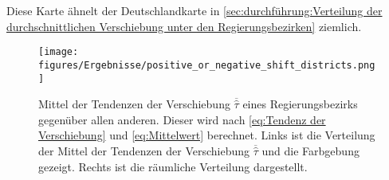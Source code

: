 Diese Karte ähnelt der Deutschlandkarte in \autoref{sec:durchführung:Verteilung der durchschnittlichen Verschiebung unter den Regierungsbezirken} ziemlich.

\begin{figure}[H]
    \centering
    \texttt{[image: figures/Ergebnisse/positive\_or\_negative\_shift\_districts.png]}
    \caption{
    Mittel der Tendenzen der Verschiebung $\overline{\hat{\tau}}$ eines Regierungsbezirks gegenüber allen anderen. Dieser wird nach \autoref{eq:Tendenz der Verschiebung} und \autoref{eq:Mittelwert} berechnet. Links ist die Verteilung der Mittel der Tendenzen der Verschiebung $\overline{\hat{\tau}}$ und die Farbgebung gezeigt. Rechts ist die räumliche Verteilung dargestellt.}
    \label{fig:positive_or_negative_shift_districts}
\end{figure}

